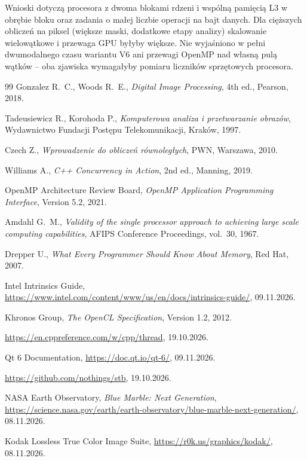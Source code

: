 \documentclass[12pt,a4paper]{article}
\begin{document}
Wnioski dotyczą procesora z dwoma blokami rdzeni i wspólną pamięcią L3 w obrębie bloku oraz zadania o małej liczbie operacji na bajt danych. Dla cięższych obliczeń na piksel (większe maski, dodatkowe etapy analizy) skalowanie wielowątkowe i przewaga GPU byłyby większe. Nie wyjaśniono w pełni dwumodalnego czasu wariantu V6 ani przewagi OpenMP nad własną pulą wątków -- oba zjawiska wymagałyby pomiaru liczników sprzętowych procesora.

\FloatBarrier
\begin{thebibliography}{99}
	Gonzalez R.~C., Woods R.~E., \emph{Digital Image Processing}, 4th ed., Pearson, 2018.

	Tadeusiewicz R., Korohoda P., \emph{Komputerowa analiza i przetwarzanie obrazów}, Wydawnictwo Fundacji Postępu Telekomunikacji, Kraków, 1997.

	Czech Z., \emph{Wprowadzenie do obliczeń równoległych}, PWN, Warszawa, 2010.

	Williams A., \emph{C++ Concurrency in Action}, 2nd ed., Manning, 2019.

	OpenMP Architecture Review Board, \emph{OpenMP Application Programming Interface}, Version 5.2, 2021.

	Amdahl G.~M., \emph{Validity of the single processor approach to achieving large scale computing capabilities}, AFIPS Conference Proceedings, vol.~30, 1967.

	Drepper U., \emph{What Every Programmer Should Know About Memory}, Red Hat, 2007.

	Intel Intrinsics Guide, \url{https://www.intel.com/content/www/us/en/docs/intrinsics-guide/}, 09.11.2026.

	Khronos Group, \emph{The OpenCL Specification}, Version 1.2, 2012.

	\url{https://en.cppreference.com/w/cpp/thread}, 19.10.2026.

	Qt 6 Documentation, \url{https://doc.qt.io/qt-6/}, 09.11.2026.

	\url{https://github.com/nothings/stb}, 19.10.2026.

	NASA Earth Observatory, \emph{Blue Marble: Next Generation}, \url{https://science.nasa.gov/earth/earth-observatory/blue-marble-next-generation/}, 08.11.2026.

	Kodak Lossless True Color Image Suite, \url{https://r0k.us/graphics/kodak/}, 08.11.2026.
\end{thebibliography}
\end{document}
